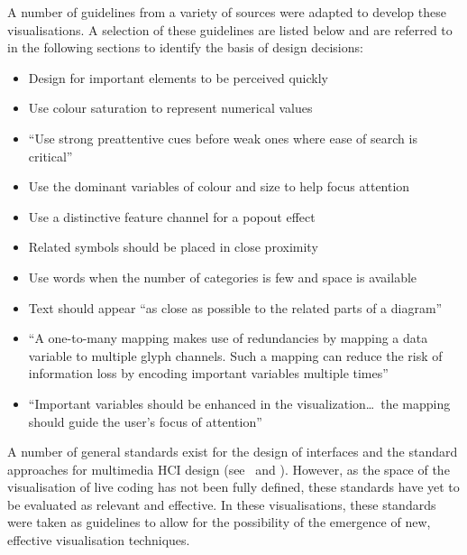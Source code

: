 A number of guidelines from a variety of sources were adapted to develop these visualisations. A selection of these guidelines are listed below and are referred to in the following sections to identify the basis of design decisions:
\begin{itemize}
\item Design for important elements to be perceived quickly \cite[p.~14]{Ware2013a}~
\item Use colour saturation to represent numerical values \cite[p.~117]{Ware2013a}~
\item ``Use strong preattentive cues before weak ones where ease of search is critical'' \cite[p.~156]{Ware2013a}~
\item Use the dominant variables of colour and size to help focus attention \cite[p.~45]{Borgo2013}~
\item Use a distinctive feature channel for a popout effect \cite[p.~157]{Ware2013a}~
\item Related symbols should be placed in close proximity \cite[p.~181]{Ware2013a}~
\item Use words when the number of categories is few and space is available \cite[p.~321]{Ware2013a}~
\item Text should appear ``as close as possible to the related parts of a diagram'' \cite[p.~333]{Ware2013a}~
\item ``A one-to-many mapping makes use of redundancies by mapping a data variable to multiple glyph channels. Such a mapping can reduce the risk of information loss by encoding important variables multiple times'' \cite[p.~52]{Borgo2013}~
\item ``Important variables should be enhanced in the visualization\ldots~the mapping should guide the user's focus of attention'' \cite[p.~52]{Borgo2013}~
\end{itemize}

A number of general standards exist for the design of interfaces and the standard approaches for multimedia \ac{HCI} design (see~\cite{ISO2002} and \cite{Bevan2006}). However, as the space of the visualisation of live coding has not been fully defined, these standards have yet to be evaluated as relevant and effective. In these visualisations, these standards were taken as guidelines to allow for the possibility of the emergence of new, effective visualisation techniques.

